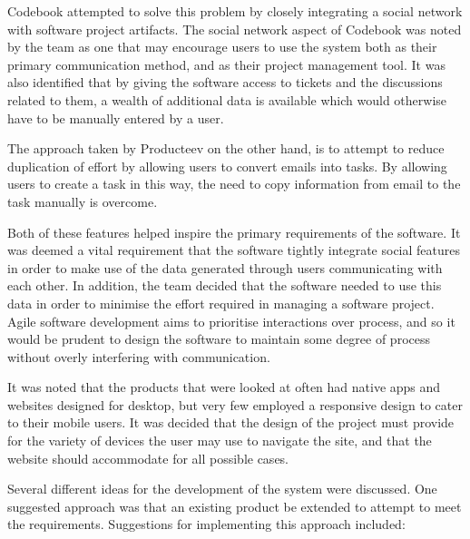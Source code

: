 \documentclass[a4paper]{l3proj}
\begin{document}
Codebook attempted to solve this problem by closely integrating a social network with software project artifacts. The social network aspect of Codebook was noted by the team as one that may encourage users to use the system both as their primary communication method, and as their project management tool. It was also identified that by giving the software access to tickets and the discussions related to them, a wealth of additional data is available which would otherwise have to be manually entered by a user.

The approach taken by Producteev on the other hand, is to attempt to reduce duplication of effort by allowing users to convert emails into tasks. By allowing users to create a task in this way, the need to copy information from email to the task manually is overcome.

Both of these features helped inspire the primary requirements of the software. It was deemed a vital requirement that the software tightly integrate social features in order to make use of the data generated through users communicating with each other. In addition, the team decided that the software needed to use this data in order to minimise the effort required in managing a software project. Agile software development aims to prioritise interactions over process, and so it would be prudent to design the software to maintain some degree of process without overly interfering with communication.

It was noted that the products that were looked at often had native apps and websites designed for desktop, but very few employed a responsive design to cater to their mobile users. It was decided that the design of the project must provide for the variety of devices the user may use to navigate the site, and that the website should accommodate for all possible cases.

Several different ideas for the development of the system were discussed. One suggested approach was that an existing product be extended to attempt to meet the requirements. Suggestions for implementing this approach included:
\end{document}
